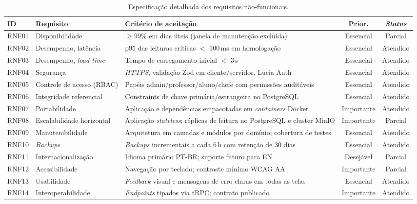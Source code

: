 \documentclass[portuguese]{sbc2025}%
\begin{document}
\begin{table}[H]
  \centering
  \small
  \caption{Especificação detalhada dos requisitos não-funcionais.}
  \label{tab:rnf-detalhe}
  \begin{tabular}{|l|p{5.5cm}|p{6.0cm}|c|c|}
    \hline
    \textbf{ID} & \textbf{Requisito} & \textbf{Critério de aceitação} & \textbf{Prior.} & \textbf{\textit{Status}} \\
    \hline
    RNF01 & Disponibilidade & $\geq 99\%$ em dias úteis (janela de manutenção excluída) & Essencial & Parcial \\ \hline
    RNF02 & Desempenho, latência & p95 das leituras críticas $<$ 100\,ms em homologação & Essencial & Atendido \\ \hline
    RNF03 & Desempenho, \textit{load time} & Tempo de carregamento inicial $<$ 3\,s & Essencial & Atendido \\ \hline
    RNF04 & Segurança & \textit{HTTPS}, validação Zod em cliente/servidor, Lucia Auth & Essencial & Atendido \\ \hline
    RNF05 & Controle de acesso (RBAC) & Papéis admin/professor/aluno/chefe com permissões auditáveis & Essencial & Atendido \\ \hline
    RNF06 & Integridade referencial & Constraints de chave primária/estrangeira no PostgreSQL & Essencial & Atendido \\ \hline
    RNF07 & Portabilidade & Aplicação e dependências empacotadas em \textit{containers} Docker & Importante & Atendido \\ \hline
    RNF08 & Escalabilidade horizontal & Aplicação \textit{stateless}; réplicas de leitura no PostgreSQL e cluster MinIO & Importante & Parcial \\ \hline
    RNF09 & Manutenibilidade & Arquitetura em camadas e módulos por domínio; cobertura de testes & Essencial & Atendido \\ \hline
    RNF10 & \textit{Backups} & \textit{Backups} incrementais a cada 6\,h com retenção de 30 dias & Essencial & Atendido \\ \hline
    RNF11 & Internacionalização & Idioma primário PT-BR; suporte futuro para EN & Desejável & Parcial \\ \hline
    RNF12 & Acessibilidade & Navegação por teclado; contraste mínimo WCAG AA & Importante & Parcial \\ \hline
    RNF13 & Usabilidade & \textit{Feedback} visual e mensagens de erro claras em todas as telas & Essencial & Atendido \\ \hline
    RNF14 & Interoperabilidade & \textit{Endpoints} tipados via tRPC; contrato publicado & Importante & Atendido \\ \hline

\end{tabular}
\end{table}
\end{document}
